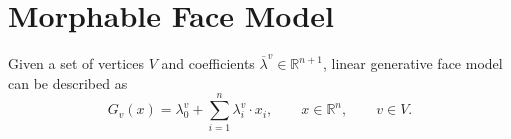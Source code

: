 \section{Morphable Face Model}

Given a set of vertices $V$
and coefficients $\overline{\lambda}^v \in \mathbb{R}^{n + 1}$,
linear generative face model can be described as
\begin{equation*}
  G_v\left( x \right) = \lambda^v_0 + \sum_{i = 1}^{n} \lambda^v_i \cdot x_i,
  \qquad x \in \mathbb{R}^n,
  \qquad v \in V.
\end{equation*}
